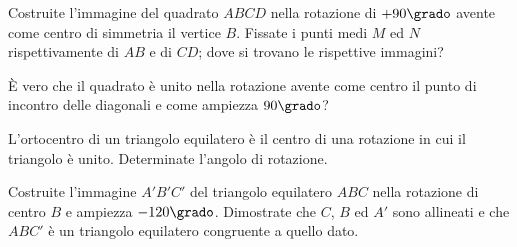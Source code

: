 \begin{esercizio}
\label{ese:8.59} %
Costruite l'immagine del quadrato \(ABCD\) nella rotazione di 
\(+90\grado\) avente come centro di simmetria il vertice \(B\).
Fissate i punti medi \(M\) ed \(N\) rispettivamente di \(AB\) e di \(CD\); 
dove si trovano le rispettive immagini?
\end{esercizio}

\begin{esercizio}
\label{ese:8.60} %
\`E vero che il quadrato è unito nella rotazione avente come centro 
il punto di incontro delle diagonali e come ampiezza \(90\grado\)?
\end{esercizio}

\begin{esercizio}
\label{ese:8.61} %
L'ortocentro di un triangolo equilatero è il centro di una rotazione 
in cui il triangolo è unito. Determinate l'angolo di rotazione.
\end{esercizio}

\begin{esercizio}
\label{ese:8.62} %
Costruite l'immagine \(A'B'C'\) del triangolo equilatero \(ABC\) nella 
rotazione di centro \(B\) e ampiezza \(-120\grado\). Dimostrate che \(C\), 
\(B\) ed \(A'\) sono allineati e che \(ABC'\) è un triangolo equilatero 
congruente a quello dato.
\end{esercizio}

